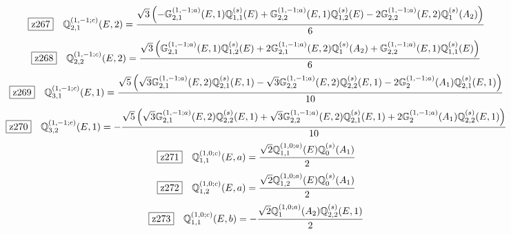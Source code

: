 \documentclass[fleqn,10pt,landscape]{jsarticle}
\begin{document}
\begin{dmath*}
\hspace*{3mm}\fbox{z267}\quad \mathbb{Q}_{2,1}^{(1,-1;c)}(E,2)=\frac{\sqrt{3} \left(- \mathbb{G}_{2,1}^{(1,-1;a)}(E,1) \mathbb{Q}_{1,1}^{(s)}(E) + \mathbb{G}_{2,2}^{(1,-1;a)}(E,1) \mathbb{Q}_{1,2}^{(s)}(E) - 2 \mathbb{G}_{2,2}^{(1,-1;a)}(E,2) \mathbb{Q}_{1}^{(s)}(A_{2})\right)}{6}
\end{dmath*}
\begin{dmath*}
\hspace*{3mm}\fbox{z268}\quad \mathbb{Q}_{2,2}^{(1,-1;c)}(E,2)=\frac{\sqrt{3} \left(\mathbb{G}_{2,1}^{(1,-1;a)}(E,1) \mathbb{Q}_{1,2}^{(s)}(E) + 2 \mathbb{G}_{2,1}^{(1,-1;a)}(E,2) \mathbb{Q}_{1}^{(s)}(A_{2}) + \mathbb{G}_{2,2}^{(1,-1;a)}(E,1) \mathbb{Q}_{1,1}^{(s)}(E)\right)}{6}
\end{dmath*}
\begin{dmath*}
\hspace*{3mm}\fbox{z269}\quad \mathbb{Q}_{3,1}^{(1,-1;c)}(E,1)=\frac{\sqrt{5} \left(\sqrt{3} \mathbb{G}_{2,1}^{(1,-1;a)}(E,2) \mathbb{Q}_{2,1}^{(s)}(E,1) - \sqrt{3} \mathbb{G}_{2,2}^{(1,-1;a)}(E,2) \mathbb{Q}_{2,2}^{(s)}(E,1) - 2 \mathbb{G}_{2}^{(1,-1;a)}(A_{1}) \mathbb{Q}_{2,1}^{(s)}(E,1)\right)}{10}
\end{dmath*}
\begin{dmath*}
\hspace*{3mm}\fbox{z270}\quad \mathbb{Q}_{3,2}^{(1,-1;c)}(E,1)=- \frac{\sqrt{5} \left(\sqrt{3} \mathbb{G}_{2,1}^{(1,-1;a)}(E,2) \mathbb{Q}_{2,2}^{(s)}(E,1) + \sqrt{3} \mathbb{G}_{2,2}^{(1,-1;a)}(E,2) \mathbb{Q}_{2,1}^{(s)}(E,1) + 2 \mathbb{G}_{2}^{(1,-1;a)}(A_{1}) \mathbb{Q}_{2,2}^{(s)}(E,1)\right)}{10}
\end{dmath*}
\begin{dmath*}
\hspace*{3mm}\fbox{z271}\quad \mathbb{Q}_{1,1}^{(1,0;c)}(E,a)=\frac{\sqrt{2} \mathbb{Q}_{1,1}^{(1,0;a)}(E) \mathbb{Q}_{0}^{(s)}(A_{1})}{2}
\end{dmath*}
\begin{dmath*}
\hspace*{3mm}\fbox{z272}\quad \mathbb{Q}_{1,2}^{(1,0;c)}(E,a)=\frac{\sqrt{2} \mathbb{Q}_{1,2}^{(1,0;a)}(E) \mathbb{Q}_{0}^{(s)}(A_{1})}{2}
\end{dmath*}
\begin{dmath*}
\hspace*{3mm}\fbox{z273}\quad \mathbb{Q}_{1,1}^{(1,0;c)}(E,b)=- \frac{\sqrt{2} \mathbb{Q}_{1}^{(1,0;a)}(A_{2}) \mathbb{Q}_{2,2}^{(s)}(E,1)}{2}
\end{dmath*}
\end{document}
